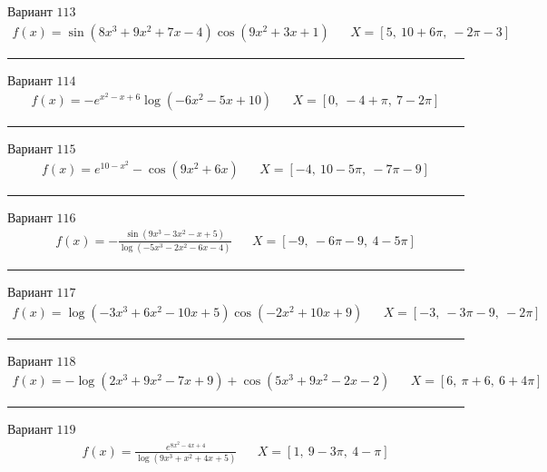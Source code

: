 \documentclass[11pt]{report}
\begin{document}
Вариант \(113\)
\begin{align*}
    f(x) = \sin{\left(8 x^{3} + 9 x^{2} + 7 x - 4 \right)} \cos{\left(9 x^{2} + 3 x + 1 \right)} && X = \left[ 5, \  10 + 6 \pi, \  - 2 \pi - 3\right]
\end{align*}
\begin{center}
    \noindent\rule{8cm}{0.4pt}
\end{center}
Вариант \(114\)
\begin{align*}
    f(x) = - e^{x^{2} - x + 6} \log{\left(- 6 x^{2} - 5 x + 10 \right)} && X = \left[ 0, \  -4 + \pi, \  7 - 2 \pi\right]
\end{align*}
\begin{center}
    \noindent\rule{8cm}{0.4pt}
\end{center}
Вариант \(115\)
\begin{align*}
    f(x) = e^{10 - x^{2}} - \cos{\left(9 x^{2} + 6 x \right)} && X = \left[ -4, \  10 - 5 \pi, \  - 7 \pi - 9\right]
\end{align*}
\begin{center}
    \noindent\rule{8cm}{0.4pt}
\end{center}
Вариант \(116\)
\begin{align*}
    f(x) = - \frac{\sin{\left(9 x^{3} - 3 x^{2} - x + 5 \right)}}{\log{\left(- 5 x^{3} - 2 x^{2} - 6 x - 4 \right)}} && X = \left[ -9, \  - 6 \pi - 9, \  4 - 5 \pi\right]
\end{align*}
\begin{center}
    \noindent\rule{8cm}{0.4pt}
\end{center}
Вариант \(117\)
\begin{align*}
    f(x) = \log{\left(- 3 x^{3} + 6 x^{2} - 10 x + 5 \right)} \cos{\left(- 2 x^{2} + 10 x + 9 \right)} && X = \left[ -3, \  - 3 \pi - 9, \  - 2 \pi\right]
\end{align*}
\begin{center}
    \noindent\rule{8cm}{0.4pt}
\end{center}
Вариант \(118\)
\begin{align*}
    f(x) = - \log{\left(2 x^{3} + 9 x^{2} - 7 x + 9 \right)} + \cos{\left(5 x^{3} + 9 x^{2} - 2 x - 2 \right)} && X = \left[ 6, \  \pi + 6, \  6 + 4 \pi\right]
\end{align*}
\begin{center}
    \noindent\rule{8cm}{0.4pt}
\end{center}
Вариант \(119\)
\begin{align*}
    f(x) = \frac{e^{8 x^{2} - 4 x + 4}}{\log{\left(9 x^{3} + x^{2} + 4 x + 5 \right)}} && X = \left[ 1, \  9 - 3 \pi, \  4 - \pi\right]
\end{align*}
\end{document}
